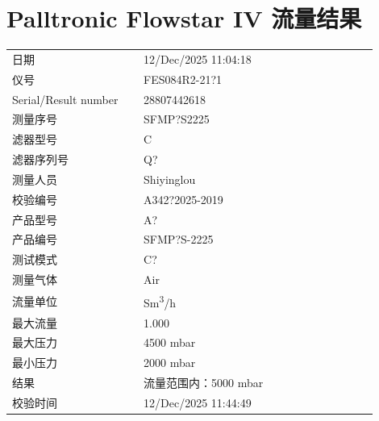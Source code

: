 \documentclass[UTF8,10pt,a4paper,fontset=fandol]{ctexart}
\newcommand{\fieldvalue}[1]{#1}
\begin{document}
\section{Palltronic Flowstar IV 流量结果}

\begin{tabular}{@{}p{0.32\linewidth}p{0.58\linewidth}@{}}
日期 &
\fieldvalue{12/Dec/2025 11:04:18}
\\[2pt]
仪号 &
\fieldvalue{FES084R2-21?1}
\\[2pt]
Serial/Result number &
\fieldvalue{28807442618}
\\[2pt]
测量序号 &
\fieldvalue{SFMP?S2225}
\\[2pt]
滤器型号 &
\fieldvalue{C}
\\[2pt]
滤器序列号 &
\fieldvalue{Q?}
\\[2pt]
测量人员 &
\fieldvalue{Shiyinglou}
\\[2pt]
校验编号 &
\fieldvalue{A342?2025-2019}
\\[2pt]
产品型号 &
\fieldvalue{A?}
\\[2pt]
产品编号 &
\fieldvalue{SFMP?S-2225}
\\[2pt]
测试模式 &
\fieldvalue{C?}
\\[2pt]
测量气体 &
\fieldvalue{Air}
\\[2pt]
流量单位 &
\fieldvalue{Sm\textsuperscript{3}/h}
\\[2pt]
最大流量 &
\fieldvalue{1.000}
\\[2pt]
最大压力 &
\fieldvalue{4500 mbar}
\\[2pt]
最小压力 &
\fieldvalue{2000 mbar}
\\[2pt]
结果 &
\fieldvalue{流量范围内：5000 mbar}
\\[2pt]
校验时间 &
\fieldvalue{12/Dec/2025 11:44:49}
\end{tabular}
\end{document}
